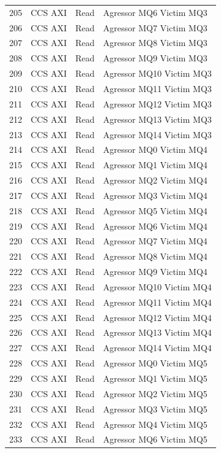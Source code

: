 \begin{center}
\begin{longtable}{|l|l|l|l|}
205 & CCS AXI & Read &  Agressor MQ6 Victim MQ3\\
206 & CCS AXI & Read &  Agressor MQ7 Victim MQ3\\
207 & CCS AXI & Read &  Agressor MQ8 Victim MQ3\\
208 & CCS AXI & Read &  Agressor MQ9 Victim MQ3\\
209 & CCS AXI & Read &  Agressor MQ10 Victim MQ3\\
210 & CCS AXI & Read &  Agressor MQ11 Victim MQ3\\
211 & CCS AXI & Read &  Agressor MQ12 Victim MQ3\\
212 & CCS AXI & Read &  Agressor MQ13 Victim MQ3\\
213 & CCS AXI & Read &  Agressor MQ14 Victim MQ3\\
214 & CCS AXI & Read &  Agressor MQ0 Victim MQ4\\
215 & CCS AXI & Read &  Agressor MQ1 Victim MQ4\\
216 & CCS AXI & Read &  Agressor MQ2 Victim MQ4\\
217 & CCS AXI & Read &  Agressor MQ3 Victim MQ4\\
218 & CCS AXI & Read &  Agressor MQ5 Victim MQ4\\
219 & CCS AXI & Read &  Agressor MQ6 Victim MQ4\\
220 & CCS AXI & Read &  Agressor MQ7 Victim MQ4\\
221 & CCS AXI & Read &  Agressor MQ8 Victim MQ4\\
222 & CCS AXI & Read &  Agressor MQ9 Victim MQ4\\
223 & CCS AXI & Read &  Agressor MQ10 Victim MQ4\\
224 & CCS AXI & Read &  Agressor MQ11 Victim MQ4\\
225 & CCS AXI & Read &  Agressor MQ12 Victim MQ4\\
226 & CCS AXI & Read &  Agressor MQ13 Victim MQ4\\
227 & CCS AXI & Read &  Agressor MQ14 Victim MQ4\\
228 & CCS AXI & Read &  Agressor MQ0 Victim MQ5\\
229 & CCS AXI & Read &  Agressor MQ1 Victim MQ5\\
230 & CCS AXI & Read &  Agressor MQ2 Victim MQ5\\
231 & CCS AXI & Read &  Agressor MQ3 Victim MQ5\\
232 & CCS AXI & Read &  Agressor MQ4 Victim MQ5\\
233 & CCS AXI & Read &  Agressor MQ6 Victim MQ5\\

\end{longtable}
\end{center}
